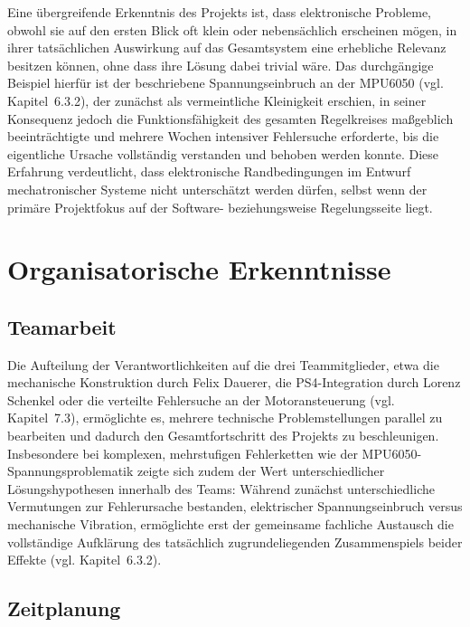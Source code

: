 \documentclass[12pt,ngerman,numbers=noenddot,abstracton,headsepline]{scrreprt}
\begin{document}
Eine übergreifende Erkenntnis des Projekts ist, dass elektronische Probleme, obwohl sie auf den ersten Blick oft klein oder nebensächlich erscheinen mögen, in ihrer tatsächlichen Auswirkung auf das Gesamtsystem eine erhebliche Relevanz besitzen können, ohne dass ihre Lösung dabei trivial wäre. Das durchgängige Beispiel hierfür ist der beschriebene Spannungseinbruch an der MPU6050 (vgl. Kapitel~6.3.2), der zunächst als vermeintliche Kleinigkeit erschien, in seiner Konsequenz jedoch die Funktionsfähigkeit des gesamten Regelkreises maßgeblich beeinträchtigte und mehrere Wochen intensiver Fehlersuche erforderte, bis die eigentliche Ursache vollständig verstanden und behoben werden konnte. Diese Erfahrung verdeutlicht, dass elektronische Randbedingungen im Entwurf mechatronischer Systeme nicht unterschätzt werden dürfen, selbst wenn der primäre Projektfokus auf der Software- beziehungsweise Regelungsseite liegt.

\section{Organisatorische Erkenntnisse}
\label{sec:organisatorische_erkenntnisse}

\subsection{Teamarbeit}
\label{subsec:lessons_teamarbeit}

Die Aufteilung der Verantwortlichkeiten auf die drei Teammitglieder, etwa die mechanische Konstruktion durch Felix Dauerer, die PS4-Integration durch Lorenz Schenkel oder die verteilte Fehlersuche an der Motoransteuerung (vgl. Kapitel~7.3), ermöglichte es, mehrere technische Problemstellungen parallel zu bearbeiten und dadurch den Gesamtfortschritt des Projekts zu beschleunigen. Insbesondere bei komplexen, mehrstufigen Fehlerketten wie der MPU6050-Spannungsproblematik zeigte sich zudem der Wert unterschiedlicher Lösungshypothesen innerhalb des Teams: Während zunächst unterschiedliche Vermutungen zur Fehlerursache bestanden, elektrischer Spannungseinbruch versus mechanische Vibration, ermöglichte erst der gemeinsame fachliche Austausch die vollständige Aufklärung des tatsächlich zugrundeliegenden Zusammenspiels beider Effekte (vgl. Kapitel~6.3.2).

\subsection{Zeitplanung}
\label{subsec:lessons_zeitplanung}
\end{document}
